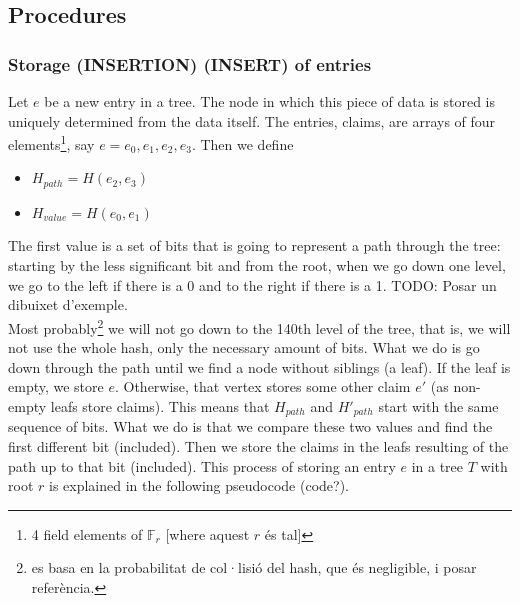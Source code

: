 \documentclass[11pt]{article}
\begin{document}
\subsection{Procedures}
\subsubsection{Storage (INSERTION) (INSERT) of entries}%

Let $e$ be a new entry in a tree. The node in which this piece of data is stored is uniquely determined from the data itself. The entries, claims, are arrays of four elements\footnote{{\color{blue}4 field elements of $\mathbb{F}_r$ [{\color{blue}where aquest $r$ és tal}]}}, say $e = e_0, e_1, e_2, e_3$. %
Then we define 
\begin{itemize}
	\item $H_{path} = H(e_2, e_3)$
	\item $H_{value} = H(e_0, e_1)$
\end{itemize}
The first value is a set of bits that is going to represent a path through the tree: starting by the less significant bit and from the root, when we go down one level, we go to the left if there is a 0 and to the right if there is a 1. {\color{blue}TODO: Posar un dibuixet d'exemple.}\\

Most probably\footnote{\color{blue}es basa en la probabilitat de col·lisió del hash, que és negligible, i posar referència.} we will not go down to the 140th level of the tree, that is, 
we will not use the whole hash, only the necessary amount of bits. What we do is go down through the path until we find a node without siblings (a leaf). If the leaf is empty, we store $e$. Otherwise, that vertex stores some other claim $e'$ (as non-empty leafs store claims). This means that $H_{path}$ and $H'_{path}$ start with the same sequence of bits. What we do is that we 
compare these two values and find the first different bit (included). Then we store the claims in the leafs resulting of the path up to that bit (included). 
%
This process of storing an entry $e$ in a tree $T$ with root $r$ is explained in the following pseudocode (code?).\\
\end{document}
